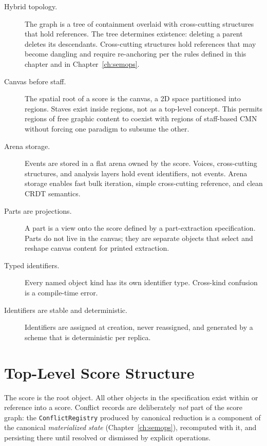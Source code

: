 \documentclass[11pt,letterpaper]{report}
\begin{document}
\begin{description}
  \item[Hybrid topology.] The graph is a tree of containment overlaid
    with cross-cutting structures that hold references. The tree
    determines existence: deleting a parent deletes its descendants.
    Cross-cutting structures hold references that may become dangling
    and require re-anchoring per the rules defined in this chapter
    and in Chapter~\ref{ch:semops}.
  \item[Canvas before staff.] The spatial root of a score is the
    canvas, a 2D space partitioned into regions. Staves exist inside
    regions, not as a top-level concept. This permits regions of
    free graphic content to coexist with regions of staff-based CMN
    without forcing one paradigm to subsume the other.
  \item[Arena storage.] Events are stored in a flat arena owned by
    the score. Voices, cross-cutting structures, and analysis layers
    hold event identifiers, not events. Arena storage enables fast
    bulk iteration, simple cross-cutting reference, and clean CRDT
    semantics.
  \item[Parts are projections.] A part is a view onto the score
    defined by a part-extraction specification. Parts do not live
    in the canvas; they are separate objects that select and reshape
    canvas content for printed extraction.
  \item[Typed identifiers.] Every named object kind has its own
    identifier type. Cross-kind confusion is a compile-time error.
  \item[Identifiers are stable and deterministic.] Identifiers are
    assigned at creation, never reassigned, and generated by a scheme
    that is deterministic per replica.
\end{description}

\section{Top-Level Score Structure}
\label{sec:graph:score}

The score is the root object. All other objects in the specification
exist within or reference into a score. Conflict records are
deliberately \emph{not} part of the score graph: the
\texttt{ConflictRegistry} produced by canonical reduction is a
component of the canonical \emph{materialized state}
(Chapter~\ref{ch:semops}), recomputed with it, and persisting there
until resolved or dismissed by explicit operations.
\end{document}

